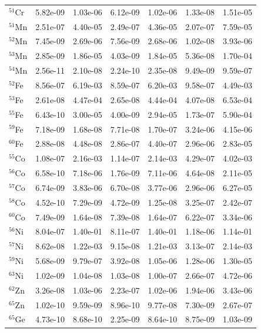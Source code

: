 \begin{table}
\begin{tabular}{l|cc|cc|cc}
$^{51}$Cr & 5.82e-09 & 1.03e-06 & 6.12e-09 & 1.02e-06 & 1.33e-08 & 1.51e-05\\
$^{51}$Mn & 2.51e-07 & 4.40e-05 & 2.49e-07 & 4.36e-05 & 2.07e-07 & 7.59e-05\\
$^{52}$Mn & 7.45e-09 & 2.69e-06 & 7.56e-09 & 2.68e-06 & 1.02e-08 & 3.93e-06\\
$^{53}$Mn & 2.85e-09 & 1.86e-05 & 4.03e-09 & 1.84e-05 & 5.36e-08 & 1.70e-04\\
$^{54}$Mn & 2.56e-11 & 2.10e-08 & 2.24e-10 & 2.35e-08 & 9.49e-09 & 9.59e-07\\
$^{52}$Fe & 8.56e-07 & 6.19e-03 & 8.59e-07 & 6.20e-03 & 9.58e-07 & 4.49e-03\\
$^{53}$Fe & 2.61e-08 & 4.47e-04 & 2.65e-08 & 4.44e-04 & 4.07e-08 & 6.53e-04\\
$^{55}$Fe & 6.43e-10 & 3.00e-05 & 4.00e-09 & 2.94e-05 & 1.73e-07 & 5.90e-04\\
$^{59}$Fe & 7.18e-09 & 1.68e-08 & 7.71e-08 & 1.70e-07 & 3.24e-06 & 4.15e-06\\
$^{60}$Fe & 2.88e-08 & 4.48e-08 & 2.86e-07 & 4.40e-07 & 2.96e-06 & 2.83e-05\\
$^{55}$Co & 1.08e-07 & 2.16e-03 & 1.14e-07 & 2.14e-03 & 4.29e-07 & 4.02e-03\\
$^{56}$Co & 6.58e-10 & 7.18e-06 & 1.76e-09 & 7.11e-06 & 4.64e-08 & 2.11e-05\\
$^{57}$Co & 6.74e-09 & 3.83e-06 & 6.70e-08 & 3.77e-06 & 2.96e-06 & 6.27e-05\\
$^{58}$Co & 4.52e-10 & 7.29e-09 & 4.72e-09 & 1.25e-08 & 3.25e-07 & 2.42e-07\\
$^{60}$Co & 7.49e-09 & 1.64e-08 & 7.39e-08 & 1.64e-07 & 6.22e-07 & 3.34e-06\\
$^{56}$Ni & 8.04e-07 & 1.40e-01 & 8.11e-07 & 1.40e-01 & 1.18e-06 & 1.14e-01\\
$^{57}$Ni & 8.62e-08 & 1.22e-03 & 9.15e-08 & 1.21e-03 & 3.13e-07 & 2.14e-03\\
$^{59}$Ni & 5.68e-09 & 9.79e-07 & 3.92e-08 & 1.05e-06 & 1.28e-06 & 1.30e-05\\
$^{63}$Ni & 1.02e-09 & 1.04e-08 & 1.03e-08 & 1.00e-07 & 2.66e-07 & 4.72e-06\\
$^{62}$Zn & 3.26e-08 & 1.03e-06 & 2.23e-07 & 1.02e-06 & 1.94e-06 & 3.43e-06\\
$^{65}$Zn & 1.02e-10 & 9.59e-09 & 8.96e-10 & 9.77e-08 & 7.30e-09 & 2.67e-07\\
$^{65}$Ge & 4.73e-10 & 8.68e-10 & 2.25e-09 & 8.64e-10 & 8.75e-09 & 1.03e-09\\
\hline
\end{tabular}
\end{table}
